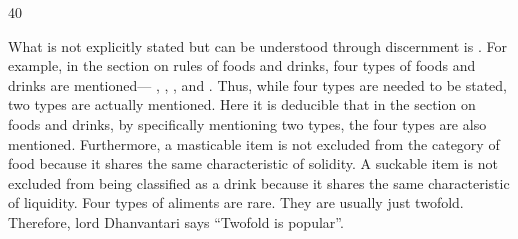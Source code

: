 \begin{translation}
\item [40] 

What is not explicitly stated but can be understood through discernment is 
. For example, in the section on rules of foods and drinks, 
four types of foods and drinks are mentioned— , 
, , and . Thus, 
while four types are needed to be stated, two types are actually mentioned. 
Here it is deducible that in the section on foods and drinks, by specifically 
mentioning two types, the four types are also mentioned. Furthermore, a 
masticable item is not excluded from the category of food because it shares the 
same characteristic of solidity. A suckable item is not excluded from being 
classified as a drink because it shares the same characteristic of liquidity. Four 
types of aliments are rare. They are usually just twofold. Therefore, lord 
Dhanvantari says “Twofold is popular”.   


\end{translation}
